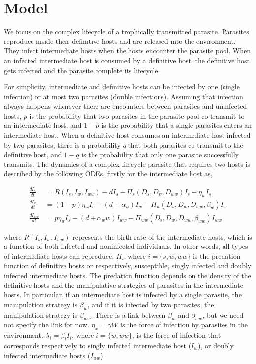 \documentclass{article}
\begin{document}
\section{Model}
We focus on the complex lifecycle of a trophically transmitted parasite. 
Parasites reproduce inside their definitive hosts and are released into the environment. 
They infect intermediate hosts when the hosts encounter the parasite pool. 
When an infected intermediate host is consumed by a definitive host, the definitive host gets infected and the parasite complete its lifecycle.

For simplicity, intermediate and definitive hosts can be infected by one (single infection) or at most two parasites (double infections). Assuming that infection always happens whenever there are encounters between parasites and uninfected hosts, $p$ is the probability that two parasites in the parasite pool co-transmit to an intermediate host, and $1-p$ is the probability that a single parasites enters an intermediate host. 
When a definitive host consumes an intermediate host infected by two parasites, there is a probability $q$ that both parasites co-transmit to the definitive host, and $1-q$ is the probability that only one parasite successfully transmits. 
The dynamics of a complex lifecycle parasite that requires two hosts is described by the following ODEs, firstly for the intermediate host as,

\begin{align}
\frac{dI_s}{dt} &= R(I_s, I_w, I_{ww}) - d I_s - \Pi_s(D_s, D_w, D_{ww}) I_s  - \eta_w  I_s \nonumber \\ 
\frac{dI_w}{dt} &=  (1 - p) \eta_w I_s  - (d + \alpha_w) I_w - \Pi_w(D_s, D_w, D_{ww}, \beta_w) I_w \label{odes:ihosts} \\
\frac{dI_{ww}}{dt} &= p \eta_w I_s  - (d + \alpha_ww) I_{ww} - \Pi_{ww}(D_s, D_w, D_{ww}, \beta_{ww}) I_{ww} \nonumber
\end{align}

where  $R(I_s, I_w, I_{ww})$ represents the birth rate of the intermediate hosts, which is a function of both infected and noninfected individuals. 
In other words, all types of intermediate hosts can reproduce. 
$\Pi_i$, where $i = \{s, w, ww\}$ is the predation function of definitive hosts on respectively, susceptible, singly infected and doubly infected intermediate hosts. 
The predation function depends on the density of the definitive hosts and the manipulative strategies of parasites in the intermediate hosts. 
In particular, if an intermediate host is infected by a single parasite, the manipulation strategy is $\beta_w$, and if it is infected by two parasites, the manipulation strategy is $\beta_{ww}$. 
There is a link between $\beta_w$ and $\beta_{ww}$, but we need not specify the link for now. 
$\eta_w = \gamma W$ is the force of infection by parasites in the environment. 
$\lambda_i = \beta_i I_i$, where $i = \{ w, ww\}$, is the force of infection that corresponds respectively to singly infected intermediate host ($I_w$), or doubly infected intermediate hosts ($I_{ww}$). 
\end{document}
